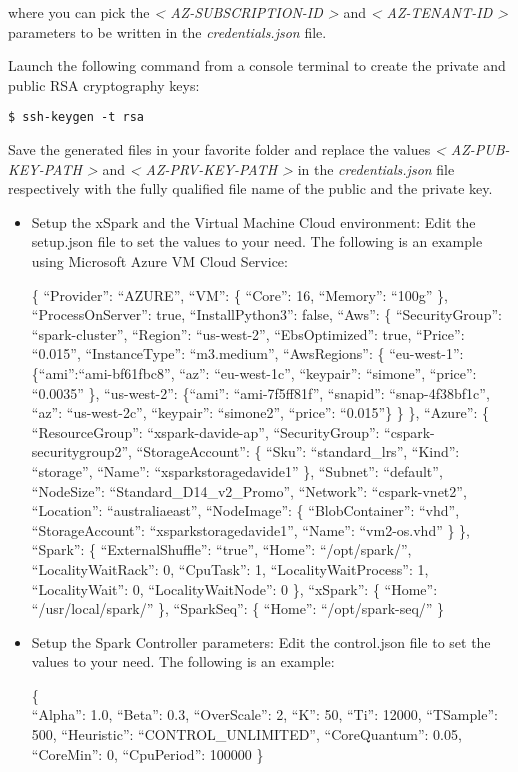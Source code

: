 \documentclass[
]{article}
\begin{document}
where you can pick the \emph{\textless{} AZ-SUBSCRIPTION-ID
\textgreater{}} and \emph{\textless{} AZ-TENANT-ID \textgreater{}}
parameters to be written in the \emph{credentials.json} file.

Launch the following command from a console terminal to create the
private and public RSA cryptography keys:

\begin{verbatim}
$ ssh-keygen -t rsa
\end{verbatim}

Save the generated files in your favorite folder and replace the values
\emph{\textless{} AZ-PUB-KEY-PATH \textgreater{}} and \emph{\textless{}
AZ-PRV-KEY-PATH \textgreater{}} in the \emph{credentials.json} file
respectively with the fully qualified file name of the public and the
private key.

\begin{itemize}
\item
  Setup the xSpark and the Virtual Machine Cloud environment: Edit the
  setup.json file to set the values to your need. The following is an
  example using Microsoft Azure VM Cloud Service:

  \{ ``Provider'': ``AZURE'', ``VM'': \{ ``Core'': 16, ``Memory'':
  ``100g'' \}, ``ProcessOnServer'': true, ``InstallPython3'': false,
  ``Aws'': \{ ``SecurityGroup'': ``spark-cluster'', ``Region'':
  ``us-west-2'', ``EbsOptimized'': true, ``Price'': ``0.015'',
  ``InstanceType'': ``m3.medium'', ``AwsRegions'': \{ ``eu-west-1'':
  \{``ami'':``ami-bf61fbc8'', ``az'': ``eu-west-1c'', ``keypair'':
  ``simone'', ``price'': ``0.0035'' \}, ``us-west-2'': \{``ami'':
  ``ami-7f5ff81f'', ``snapid'': ``snap-4f38bf1c'', ``az'':
  ``us-west-2c'', ``keypair'': ``simone2'', ``price'': ``0.015''\} \}
  \}, ``Azure'': \{ ``ResourceGroup'': ``xspark-davide-ap'',
  ``SecurityGroup'': ``cspark-securitygroup2'', ``StorageAccount'': \{
  ``Sku'': ``standard\_lrs'', ``Kind'': ``storage'', ``Name'':
  ``xsparkstoragedavide1'' \}, ``Subnet'': ``default'', ``NodeSize'':
  ``Standard\_D14\_v2\_Promo'', ``Network'': ``cspark-vnet2'',
  ``Location'': ``australiaeast'', ``NodeImage'': \{ ``BlobContainer'':
  ``vhd'', ``StorageAccount'': ``xsparkstoragedavide1'', ``Name'':
  ``vm2-os.vhd'' \} \}, ``Spark'': \{ ``ExternalShuffle'': ``true'',
  ``Home'': ``/opt/spark/'', ``LocalityWaitRack'': 0, ``CpuTask'': 1,
  ``LocalityWaitProcess'': 1, ``LocalityWait'': 0, ``LocalityWaitNode'':
  0 \}, ``xSpark'': \{ ``Home'': ``/usr/local/spark/'' \}, ``SparkSeq'':
  \{ ``Home'': ``/opt/spark-seq/'' \}
\item
  Setup the Spark Controller parameters: Edit the control.json file to
  set the values to your need. The following is an example:

  \{\\
  ``Alpha'': 1.0, ``Beta'': 0.3, ``OverScale'': 2, ``K'': 50, ``Ti'':
  12000, ``TSample'': 500, ``Heuristic'': ``CONTROL\_UNLIMITED'',
  ``CoreQuantum'': 0.05, ``CoreMin'': 0, ``CpuPeriod'': 100000 \}
\end{itemize}
\end{document}
